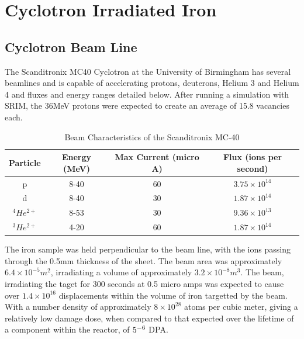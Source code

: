 
\section{Cyclotron Irradiated Iron}

\subsection{Cyclotron Beam Line}

The Scanditronix MC40 Cyclotron at the University of Birmingham has several beamlines and is capable of accelerating protons, deuterons, Helium 3 and Helium 4 and fluxes and energy ranges detailed below.  After running a simulation with SRIM, the 36MeV protons were expected to create an average of 15.8 vacancies each.

\begin{table}[h]
\begin{center}
\begin{tabular}{c c c c}
\hline
Particle & Energy (MeV) & Max Current (micro A) & Flux (ions per second)\\
\hline
p & 8-40 & 60 & $3.75 \times 10^14$ \\
d & 8-40 & 30 & $1.87 \times 10^14$ \\
${}^4 He^{2+}$ & 8-53 & 30 & $9.36 \times 10^13$ \\
${}^3 He^{2+}$ & 4-20 & 60 & $1.87 \times 10^14$ \\
\end{tabular}
\end{center}
\caption{Beam Characteristics of the Scanditronix MC-40}
\end{table}

The iron sample was held perpendicular to the beam line, with the ions passing through the 0.5mm thickness of the sheet.  The beam area was approximately $6.4 \times 10^{-5} m^2$, irradiating a volume of approximately $3.2 \times 10^{-8} m^3$.  The beam, irradiating the taget for 300 seconds at 0.5 micro amps was expected to cause over $1.4 \times 10^16$ displacements within the volume of iron targetted by the beam.  With a number density of approximately $8\times10^28$ atoms per cubic meter, giving a relatively low damage dose, when compared to that expected over the lifetime of a component within the reactor, of $5 \time 10^{-6}$ DPA.

